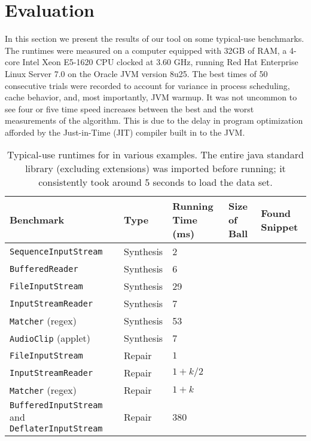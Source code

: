 \section{Evaluation}
\label{sec:evaluation}

In this section we present the results of our tool on some typical-use benchmarks. The runtimes were measured on a computer equipped with 32GB of RAM, a 4-core Intel Xeon E5-1620 CPU clocked at 3.60 GHz, running Red Hat Enterprise Linux Server 7.0 on the Oracle JVM version 8u25. The best times of 50 consecutive trials were recorded to account for variance in process scheduling, cache behavior, and, most importantly, JVM warmup. It was not uncommon to see four or five time speed increases between the best and the worst measurements of the algorithm. This is due to the delay in program optimization afforded by the Just-in-Time (JIT) compiler built in to the JVM.

\begin{table*}[t]
  \centering
  \renewcommand{\arraystretch}{1.25}
  \begin{tabularx}{\textwidth}{| X | l | l | l | l |}
    \hline
    \textbf{Benchmark} & \textbf{Type} & \textbf{Running Time (ms)} & \textbf{Size of Ball} & \textbf{Found Snippet} \\ \hline
	\texttt{SequenceInputStream} & Synthesis & 2   & & \\ \hline
    \texttt{BufferedReader}      & Synthesis & 6   & & \\ \hline
    \texttt{FileInputStream}     & Synthesis & 29  & & \\ \hline
    \texttt{InputStreamReader}   & Synthesis & 7   & & \\ \hline
    \texttt{Matcher} (regex)     & Synthesis & 53  & & \\ \hline
    \texttt{AudioClip} (applet)  & Synthesis & 7   & & \\ \hline
    \texttt{FileInputStream}     & Repair    & $1$         & & \\ \hline
    \texttt{InputStreamReader}   & Repair    & $1 + k / 2$ & & \\ \hline
    \texttt{Matcher} (regex)     & Repair    & $1 + k$     & & \\ \hline
    \texttt{BufferedInputStream} and \texttt{DeflaterInputStream} & Repair    & 380     & & \\ \hline
  \end{tabularx}
  \caption{Typical-use runtimes for \ourTool in various examples. The entire java standard library (excluding extensions) was imported before running; it consistently took around 5 seconds to load the data set.}
  \label{eval:runtime}
\end{table*}

\lipsum[1]
